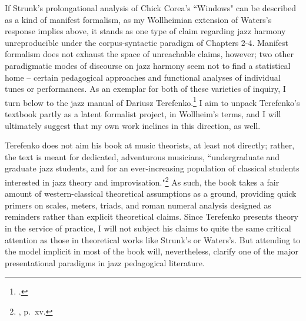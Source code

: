 If Strunk's prolongational analysis of Chick Corea's ``Windows" can be described as a kind of manifest formalism, as my Wollheimian extension of Waters's response implies above, it stands as one type of claim regarding jazz harmony unreproducible under the corpus-syntactic paradigm of Chapters 2-4.  Manifest formalism does not exhaust the space of unreachable claims, however; two other paradigmatic modes of discourse on jazz harmony seem not to find a statistical home -- certain pedagogical approaches and functional analyses of individual tunes or performances.  As an exemplar for both of these varieties of inquiry, I turn below to the jazz manual of Dariusz Terefenko.\footnote{\cite{terefenko2014}.}  I aim to unpack Terefenko's textbook partly as a latent formalist project, in Wollheim's terms, and I will ultimately suggest that my own work inclines in this direction, as well.

Terefenko does not aim his book at music theorists, at least not directly; rather, the text is meant for dedicated, adventurous musicians, ``undergraduate and graduate jazz students, and for an ever-increasing population of classical students interested in jazz theory and improvisation."\footnote{\cite{terefenko2014}, p.\ xv.}  As such, the book takes a fair amount of western-classical theoretical assumptions as a ground, providing quick primers on scales, meters, triads, and roman numeral analysis designed as reminders rather than explicit theoretical claims.  Since Terefenko presents theory in the service of practice, I will not subject his claims to quite the same critical attention as those in theoretical works like Strunk's or Waters's.  But attending to the model implicit in most of the book will, nevertheless, clarify one of the major presentational paradigms in jazz pedagogical literature.

